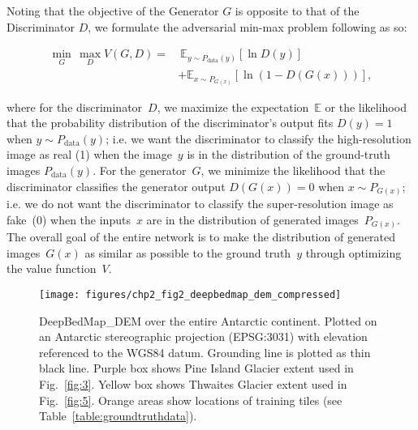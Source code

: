 Noting that the objective of the Generator $G$ is opposite to that of the Discriminator $D$, we formulate the adversarial min-max problem following \citet{GoodfellowGenerativeAdversarialNetworks2014} as so:

\begin{equation}\label{eq:4}
  \begin{split}
  \min_{G}\,\max_{D} V(G,D) =&~\mathbb{E}_{y \sim P_{\text{data}}(y)}[\ln D(y)]\\
  &+ \mathbb{E}_{x \sim P_{G(x)}}[\ln(1-D(G(x)))],
  \end{split}
\end{equation}

where for the discriminator~$D$, we maximize the expectation~$\mathbb{E}$ or the likelihood that the probability distribution of the discriminator's output fits $D(y)=1$ when $y \sim P_{\text{data}}(y)$; i.e. we want the discriminator to classify the high-resolution image as real (1) when the image~$y$ is in the distribution of the ground-truth images $P_{\text{data}}(y)$.
For the generator~$G$, we minimize the likelihood that the discriminator classifies the generator output $D(G(x))=0$ when $x \sim P_{G(x)}$; i.e. we do not want the discriminator to classify the super-resolution image as fake~(0) when the inputs~$x$ are in the distribution of generated images~$P_{G(x)}$.
The overall goal of the entire network is to make the distribution of generated images~$G(x)$ as similar as possible to the ground truth~$y$ through optimizing the value function~$V$.

\begin{figure*}[ht]
    \texttt{[image: figures/chp2\_fig2\_deepbedmap\_dem\_compressed]}
    \caption[DeepBedMap\_DEM overview map over the entire Antarctic continent]{
      DeepBedMap\_DEM over the entire Antarctic continent.
      Plotted on an Antarctic stereographic projection (EPSG:3031) with elevation referenced to the WGS84 datum.
      Grounding line is plotted as thin black line.
      Purple box shows Pine Island Glacier extent used in Fig.~\ref{fig:3}.
      Yellow box shows Thwaites Glacier extent used in Fig.~\ref{fig:5}.
      Orange areas show locations of training tiles (see Table~\ref{table:groundtruthdata}).
    }
    \label{fig:2}
\end{figure*}

